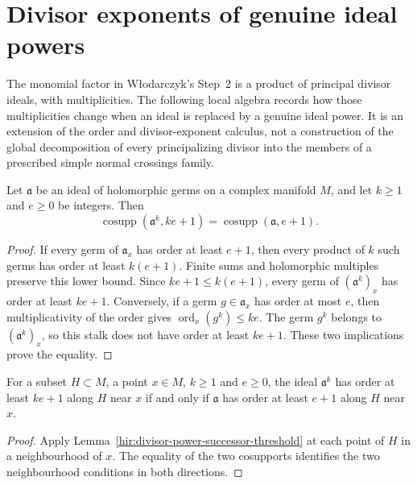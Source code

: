 \section{Divisor exponents of genuine ideal powers}
\label{sec:hironaka-divisor-extension}

The monomial factor in W{\l}odarczyk's Step~2 is a product of principal
divisor ideals, with multiplicities.  The following local algebra records
how those multiplicities change when an ideal is replaced by a genuine
ideal power.  It is an extension of the order and divisor-exponent calculus,
not a construction of the global decomposition of every principalizing
divisor into the members of a prescribed simple normal crossings family.

\begin{lemma}
\label{hir:divisor-power-successor-threshold}
\leanok
Let $\mathfrak a$ be an ideal of holomorphic germs on a complex manifold
$M$, and let $k\geq 1$ and $e\geq 0$ be integers.  Then
\[
 \operatorname{cosupp}(\mathfrak a^k,ke+1)
 =\operatorname{cosupp}(\mathfrak a,e+1).
\]
\end{lemma}
\begin{proof}
If every germ of $\mathfrak a_x$ has order at least $e+1$, then every
product of $k$ such germs has order at least $k(e+1)$.  Finite sums and
holomorphic multiples preserve this lower bound.  Since
$ke+1\leq k(e+1)$, every germ of $(\mathfrak a^k)_x$ has order at least
$ke+1$.  Conversely, if a germ $g\in\mathfrak a_x$ has order at most $e$,
then multiplicativity of the order gives
$\operatorname{ord}_x(g^k)\leq ke$.  The germ $g^k$ belongs to
$(\mathfrak a^k)_x$, so this stalk does not have order at least $ke+1$.
These two implications prove the equality.
\end{proof}

\begin{lemma}
\label{hir:divisor-power-divisibility-threshold}
\leanok
For a subset $H\subset M$, a point $x\in M$, $k\geq1$ and $e\geq0$,
the ideal $\mathfrak a^k$ has order at least $ke+1$ along $H$ near $x$
if and only if $\mathfrak a$ has order at least $e+1$ along $H$ near $x$.
\end{lemma}
\begin{proof}
Apply Lemma~\ref{hir:divisor-power-successor-threshold} at each point
of $H$ in a neighbourhood of $x$.  The equality of the two cosupports
identifies the two neighbourhood conditions in both directions.
\end{proof}

